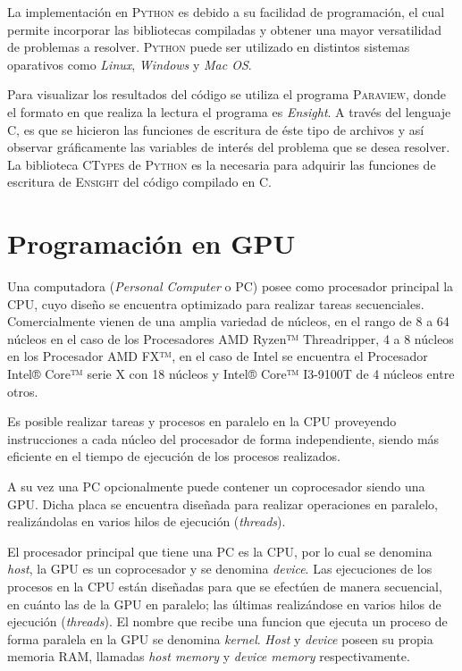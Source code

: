La implementación en \textsc{Python} es debido a su facilidad de programación, el cual permite incorporar las bibliotecas compiladas y obtener una mayor versatilidad de problemas a resolver. \textsc{Python} puede ser utilizado en distintos sistemas oparativos como \textit{Linux}, \textit{Windows} y \textit{Mac OS}. 

Para visualizar los resultados del código se utiliza el programa \textsc{Paraview}, donde el formato en que realiza la lectura el programa es \textit{Ensight}. A través del lenguaje \textsc{C}, es que se hicieron las funciones de escritura de éste tipo de archivos y así observar gráficamente las variables de interés del problema que se desea resolver. La biblioteca \textsc{CTypes} de \textsc{Python} es la necesaria para adquirir las funciones de escritura de \textsc{Ensight} del código compilado en \textsc{C}.



\section{Programación en GPU}

Una computadora (\textit{Personal Computer} o PC) posee como procesador principal la CPU, cuyo diseño se encuentra optimizado para realizar tareas secuenciales. Comercialmente vienen de una amplia variedad de núcleos, en el rango de 8 a 64 núcleos en el caso de los Procesadores AMD Ryzen™ Threadripper, 4 a 8 núcleos en los Procesador AMD FX™, en el caso de Intel se encuentra el Procesador Intel® Core™ serie X con 18 núcleos y  Intel® Core™ I3-9100T de 4 núcleos entre otros. \cite{edp:2020:amd} \cite{icp:2020:intel}

Es posible realizar tareas y procesos en paralelo en la CPU proveyendo instrucciones a cada núcleo del procesador de forma independiente, siendo más eficiente en el tiempo de ejecución de los procesos realizados.

A su vez una PC opcionalmente puede contener un coprocesador siendo una GPU. Dicha placa se encuentra diseñada para realizar operaciones en paralelo, realizándolas en varios hilos de ejecución (\textit{threads}).




El procesador principal que tiene una PC es la CPU, por lo cual se denomina \textit{host}, la GPU es un coprocesador y se denomina \textit{device}. Las ejecuciones de los procesos en la CPU están diseñadas para que se efectúen de manera secuencial, en cuánto las de la GPU en paralelo; las últimas realizándose en varios hilos de ejecución (\textit{threads}). El nombre que recibe una funcion que ejecuta un proceso de forma paralela en la GPU se denomina \textit{kernel}. \textit{Host} y \textit{device} poseen su propia memoria RAM, llamadas \textit{host memory} y \textit{device memory} respectivamente. \cite{rinaldi2011modelos}

